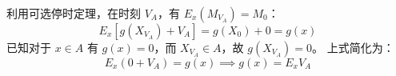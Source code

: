 \begin{questions}
\begin{parts}
\begin{solution}
        利用可选停时定理，在时刻 $V_A$，有 $E_x(M_{V_A}) = M_0$：
        \[
        E_x [g(X_{V_A}) + V_A] = g(X_0) + 0 = g(x)
        \]
        已知对于 $x \in A$ 有 $g(x) = 0$，而 $X_{V_A} \in A$，故 $g(X_{V_A}) = 0$。
        上式简化为：
        \[
        E_x(0 + V_A) = g(x) \implies g(x) = E_x V_A
        \]
    \end{solution}
\end{parts}
\end{questions}
\pagebreak